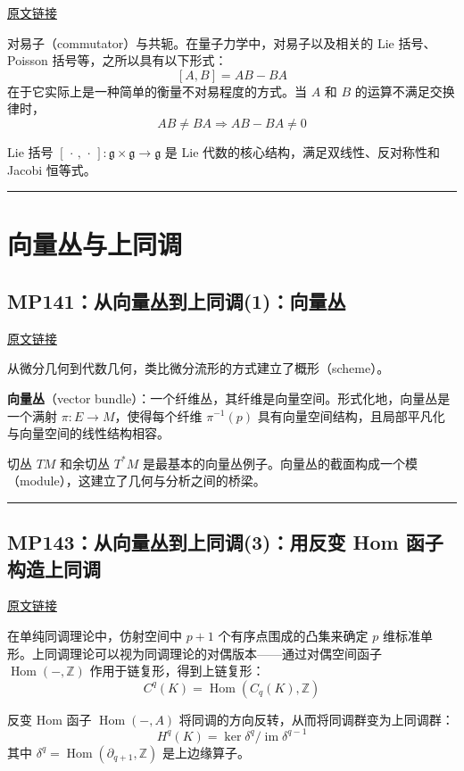 \documentclass[10pt, openany]{book}
\begin{document}
\href{https://zhuanlan.zhihu.com/p/60246443}{原文链接}

对易子（commutator）与共轭。在量子力学中，对易子以及相关的 Lie 括号、Poisson 括号等，之所以具有以下形式：
\[
[A,B] = AB - BA
\]
在于它实际上是一种简单的衡量不对易程度的方式。当 $A$ 和 $B$ 的运算不满足交换律时，
\[
AB \neq BA \Rightarrow AB - BA \neq 0
\]

Lie 括号 $[\,\cdot\,,\,\cdot\,]: \mathfrak{g} \times \mathfrak{g} \to \mathfrak{g}$ 是 Lie 代数的核心结构，满足双线性、反对称性和 Jacobi 恒等式。

\medskip
\noindent\rule{\textwidth}{0.4pt}

\chapter{向量丛与上同调}

\section{MP141：从向量丛到上同调(1)：向量丛}
\label{sec:mp141}

\href{https://zhuanlan.zhihu.com/p/51318464}{原文链接}

从微分几何到代数几何，类比微分流形的方式建立了概形（scheme）。

\textbf{向量丛}（vector bundle）：一个纤维丛，其纤维是向量空间。形式化地，向量丛是一个满射 $\pi: E \to M$，使得每个纤维 $\pi^{-1}(p)$ 具有向量空间结构，且局部平凡化与向量空间的线性结构相容。

切丛 $TM$ 和余切丛 $T^*M$ 是最基本的向量丛例子。向量丛的截面构成一个模（module），这建立了几何与分析之间的桥梁。

\medskip
\noindent\rule{\textwidth}{0.4pt}

\section{MP143：从向量丛到上同调(3)：用反变 Hom 函子构造上同调}
\label{sec:mp143}

\href{https://zhuanlan.zhihu.com/p/46850778}{原文链接}

在单纯同调理论中，仿射空间中 $p+1$ 个有序点围成的凸集来确定 $p$ 维标准单形。上同调理论可以视为同调理论的对偶版本——通过对偶空间函子 $\operatorname{Hom}(-,\mathbb{Z})$ 作用于链复形，得到上链复形：
\[
C^q(K) = \operatorname{Hom}(C_q(K), \mathbb{Z})
\]

反变 Hom 函子 $\operatorname{Hom}(-,A)$ 将同调的方向反转，从而将同调群变为上同调群：
\[
H^q(K) = \ker \delta^q / \operatorname{im} \delta^{q-1}
\]
其中 $\delta^q = \operatorname{Hom}(\partial_{q+1}, \mathbb{Z})$ 是上边缘算子。
\end{document}
